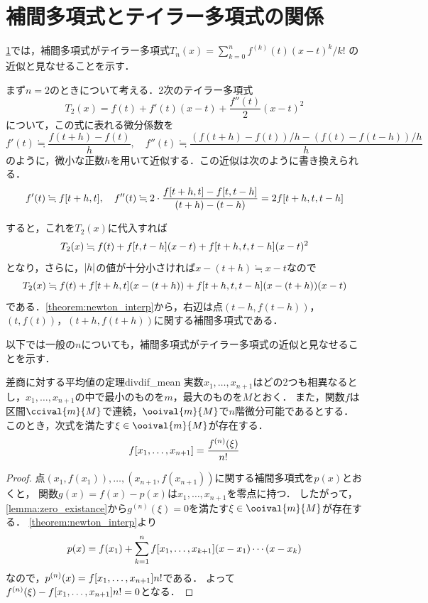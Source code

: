 \documentclass[../../numcalc]{subfiles}
\begin{document}
\section{補間多項式とテイラー多項式の関係}
\label{section:taylor}
\cref{section:taylor}では，補間多項式がテイラー多項式\(T_n(x)=\sum_{k=0}^nf^{(k)}(t)(x-t)^k/k!\)
の近似と見なせることを示す．

まず\(n=2\)のときについて考える．2次のテイラー多項式
\[
  T_2(x) = f(t)+f'(t)(x-t)+\frac{f''(t)}{2}(x-t)^2
\]
について，この式に表れる微分係数を
\[
  f'(t) \fallingdotseq \frac{f(t+h)-f(t)}{h},
  \quad f''(t) \fallingdotseq \frac{(f(t+h)-f(t))/h-(f(t)-f(t-h))/h}{h}
\]
のように，微小な正数\(h\)を用いて近似する．この近似は次のように書き換えられる．
\[
  f'(t) \fallingdotseq \divdiff[f]{t+h,t},
  \quad f''(t) \fallingdotseq 2\cdot\frac{\divdiff[f]{t+h,t}-\divdiff[f]{t,t-h}}{(t+h)-(t-h)}
  = 2\divdiff[f]{t+h,t,t-h}
\]

すると，これを\(T_2(x)\)に代入すれば
\[
  T_2(x)\fallingdotseq f(t)+\divdiff[f]{t,t-h}(x-t)+\divdiff[f]{t+h,t,t-h}(x-t)^2
\]
となり，さらに，\(\abs{h}\)の値が十分小さければ\(x-(t+h)\fallingdotseq x-t\)なので
\[
  T_2(x)\fallingdotseq f(t)+\divdiff[f]{t+h,t}(x-(t+h))+\divdiff[f]{t+h,t,t-h}(x-(t+h))(x-t)
\]
である．\cref{theorem:newton_interp}から，右辺は点\((t-h,f(t-h))\)，\((t,f(t))\)，\((t+h,f(t+h))\)に関する補間多項式である．

以下では一般の\(n\)についても，補間多項式がテイラー多項式の近似と見なせることを示す．

\begin{theorem}{差商に対する平均値の定理}{divdif_mean}
実数\(x_1,\dots,x_{n+1}\)はどの2つも相異なるとし，\(x_1,\dots,x_{n+1}\)の中で最小のものを\(m\)，最大のものを\(M\)とおく．
また，関数\(f\)は区間\(\ccival{m}{M}\)で連続，\(\ooival{m}{M}\)で\(n\)階微分可能であるとする．
このとき，次式を満たす\(\xi\in\ooival{m}{M}\)が存在する．
\[
  \divdiff[f]{x_1,\dots,x_{n+1}} = \frac{f^{(n)}(\xi)}{n!}
\]
\end{theorem}

\begin{proof}
点\((x_1,f(x_1)),\dots,(x_{n+1},f(x_{n+1}))\)に関する補間多項式を\(p(x)\)とおくと，
関数\(g(x)=f(x)-p(x)\)は\(x_1,\dots,x_{n+1}\)を零点に持つ．
したがって，\cref{lemma:zero_existance}から\(g^{(n)}(\xi)=0\)を満たす\(\xi\in\ooival{m}{M}\)が存在する．
\cref{theorem:newton_interp}より
\[
  p(x) = f(x_1)+\sum_{k=1}^{n}\divdiff[f]{x_1,\dots,x_{k+1}}(x-x_1)\dotsm(x-x_k)
\]
なので，\(p^{(n)}(x)=\divdiff[f]{x_1,\dots,x_{n+1}}n!\)である．
よって\(f^{(n)}(\xi)-\divdiff[f]{x_1,\dots,x_{n+1}}n!=0\)となる．
\end{proof}
\end{document}
